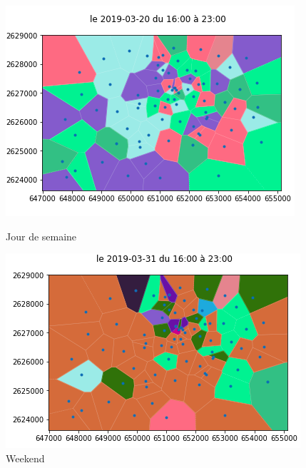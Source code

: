 \documentclass{report}
\begin{document}
\begin{figure}[H]
  \begin{minipage}{0.4\textwidth}
    \centering
    \includegraphics[scale=0.55]{images/S16_23.png}
    \caption{Jour de semaine}\label{Fig:Data1}
  \end{minipage}\hfill
  \begin{minipage}{0.4\textwidth}
    \centering
    \includegraphics[scale=0.55]{images/W16_23.png}
    \caption{Weekend}\label{Fig:Data2}
  \end{minipage}
\end{figure}\\
\end{document}
